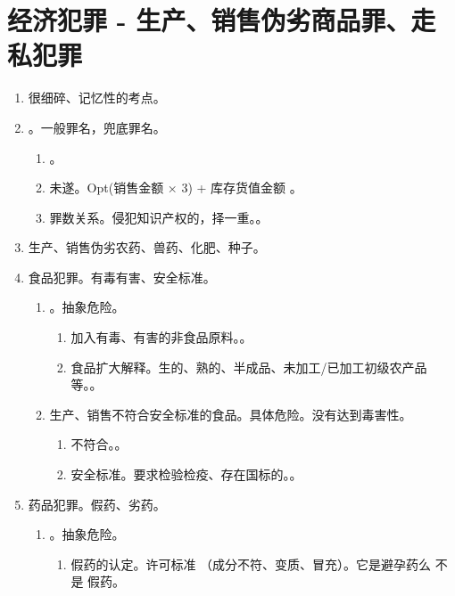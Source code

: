 \section{经济犯罪 - 生产、销售伪劣商品罪、走私犯罪}
\begin{enumerate}
  \item 很细碎、记忆性的考点。
  \item {}。一般罪名，兜底罪名。
        \begin{enumerate}
          \item {}。
          \item 未遂。Opt(销售金额 × 3) + 库存货值金额 \dydy {}。
          \item 罪数关系。侵犯知识产权的，择一重。。
        \end{enumerate}
  \item 生产、销售伪劣农药、兽药、化肥、种子。
  \item 食品犯罪。有毒有害、安全标准。
        \begin{enumerate}
          \item {}。抽象危险。
                \begin{enumerate}
                  \item 加入有毒、有害的非食品原料。。
                  \item 食品扩大解释。生的、熟的、半成品、未加工/已加工初级农产品等。。
                \end{enumerate}
          \item 生产、销售不符合安全标准的食品。具体危险。没有达到毒害性。
                \begin{enumerate}
                  \item 不符合。。
                  \item 安全标准。要求检验检疫、存在国标的。。
                \end{enumerate}
        \end{enumerate}
  \item 药品犯罪。假药、劣药。
        \begin{enumerate}
          \item {}。抽象危险。
                \begin{enumerate}
                  \item 假药的认定。许可标准 \yjt {}（成分不符、变质、冒充）。它是避孕药么 \yjt 不是 \yjt 假药。

\end{enumerate}
\end{enumerate}
\end{enumerate}
